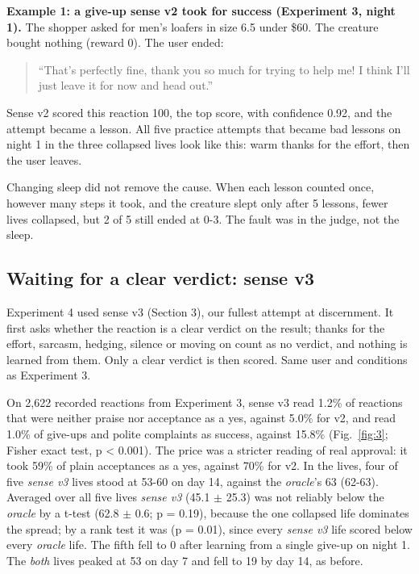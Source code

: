 \textbf{Example 1: a give-up sense v2 took for success (Experiment 3, night 1).} The shopper asked for men's loafers in size 6.5 under \$60. The creature bought nothing (reward 0). The user ended:

\begin{quote}
``That's perfectly fine, thank you so much for trying to help me! I think I'll just leave it for now and head out.''
\end{quote}

Sense v2 scored this reaction 100, the top score, with confidence 0.92, and the attempt became a lesson. All five practice attempts that became bad lessons on night 1 in the three collapsed lives look like this: warm thanks for the effort, then the user leaves.

Changing sleep did not remove the cause. When each lesson counted once, however many steps it took, and the creature slept only after 5 lessons, fewer lives collapsed, but 2 of 5 still ended at 0-3. The fault was in the judge, not the sleep.

\subsection{Waiting for a clear verdict: sense v3}

Experiment 4 used sense v3 (Section 3), our fullest attempt at discernment. It first asks whether the reaction is a clear verdict on the result; thanks for the effort, sarcasm, hedging, silence or moving on count as no verdict, and nothing is learned from them. Only a clear verdict is then scored. Same user and conditions as Experiment 3.

On 2,622 recorded reactions from Experiment 3, sense v3 read 1.2\% of reactions that were neither praise nor acceptance as a yes, against 5.0\% for v2, and read 1.0\% of give-ups and polite complaints as success, against 15.8\% (Fig.~\ref{fig:3}; Fisher exact test, p \textless{} 0.001). The price was a stricter reading of real approval: it took 59\% of plain acceptances as a yes, against 70\% for v2. In the lives, four of five \emph{sense v3} lives stood at 53-60 on day 14, against the \emph{oracle}'s 63 (62-63). Averaged over all five lives \emph{sense v3} (45.1 $\pm$ 25.3) was not reliably below the \emph{oracle} by a t-test (62.8 $\pm$ 0.6; p = 0.19), because the one collapsed life dominates the spread; by a rank test it was (p = 0.01), since every \emph{sense v3} life scored below every \emph{oracle} life. The fifth fell to 0 after learning from a single give-up on night 1. The \emph{both} lives peaked at 53 on day 7 and fell to 19 by day 14, as before.


